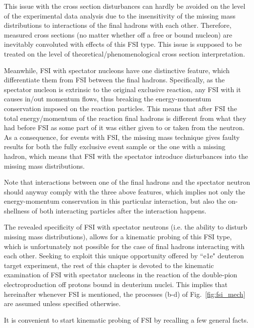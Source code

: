 This issue with the cross section disturbances can hardly be avoided on the level of the experimental data analysis due to the insensitivity of the missing mass distributions to interactions of the final hadrons with each other. Therefore, measured cross sections (no matter whether off a free or bound nucleon) are inevitably convoluted with effects of this FSI type. This issue is supposed to be treated on the level of theoretical/phenomenological cross section interpretation.



Meanwhile, FSI with spectator nucleons have one distinctive feature, which differentiate them from FSI between the final hadrons. Specifically, as the spectator nucleon is extrinsic to the original exclusive reaction, any FSI with it causes in/out momentum flows, thus breaking the energy-momentum conservation imposed on the reaction particles. This means that after FSI the total energy/momentum of the reaction final hadrons is different from what they had before FSI as some part of it was either given to or taken from the neutron. As a consequence, for events with FSI, the missing mass technique gives faulty results for both the fully exclusive event sample or the one with a missing hadron, which means that FSI with the spectator introduce disturbances into the missing mass distributions.


Note that interactions between one of the final hadrons and the spectator neutron should anyway comply with the three above features, which implies not only the energy-momentum conservation in this particular interaction, but also the on-shellness of both interacting particles after the interaction happens.


The revealed specificity of FSI with spectator neutrons (i.e. the ability to disturb missing mass distributions), allows for a kinematic probing of this FSI type, which is unfortunately not possible for the case of final hadrons interacting with each other. Seeking to exploit this unique opportunity offered by ``e1e" deuteron target experiment, the rest of this chapter is devoted to the kinematic examination of FSI with spectator nucleons in the reaction of the double-pion electroproduction off protons bound in deuterium nuclei. This implies that hereinafter whenever FSI is mentioned, the processes (b-d) of Fig.~\ref{fig:fsi_mech} are assumed unless specified otherwise.


It is convenient to start kinematic probing of FSI by recalling a few general facts. 


